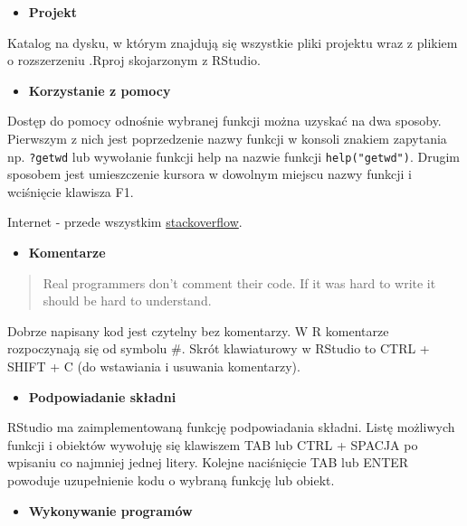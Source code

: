 \documentclass[]{book}
\providecommand{\tightlist}{%
  \setlength{\itemsep}{0pt}\setlength{\parskip}{0pt}}
\begin{document}
\begin{itemize}
\tightlist
\item
  \textbf{Projekt}
\end{itemize}

Katalog na dysku, w którym znajdują się wszystkie pliki projektu wraz z
plikiem o rozszerzeniu .Rproj skojarzonym z RStudio.

\begin{itemize}
\tightlist
\item
  \textbf{Korzystanie z pomocy}
\end{itemize}

Dostęp do pomocy odnośnie wybranej funkcji można uzyskać na dwa sposoby.
Pierwszym z nich jest poprzedzenie nazwy funkcji w konsoli znakiem
zapytania np. \texttt{?getwd} lub wywołanie funkcji help na nazwie
funkcji \texttt{help("getwd")}. Drugim sposobem jest umieszczenie
kursora w dowolnym miejscu nazwy funkcji i wciśnięcie klawisza F1.

Internet - przede wszystkim
\href{https://stackoverflow.com/questions/tagged/r}{stackoverflow}.

\begin{itemize}
\tightlist
\item
  \textbf{Komentarze}
\end{itemize}

\begin{quote}
Real programmers don't comment their code. If it was hard to write it
should be hard to understand.
\end{quote}

Dobrze napisany kod jest czytelny bez komentarzy. W R komentarze
rozpoczynają się od symbolu \#. Skrót klawiaturowy w RStudio to CTRL +
SHIFT + C (do wstawiania i usuwania komentarzy).

\begin{itemize}
\tightlist
\item
  \textbf{Podpowiadanie składni}
\end{itemize}

RStudio ma zaimplementowaną funkcję podpowiadania składni. Listę
możliwych funkcji i obiektów wywołuję się klawiszem TAB lub CTRL +
SPACJA po wpisaniu co najmniej jednej litery. Kolejne naciśnięcie TAB
lub ENTER powoduje uzupełnienie kodu o wybraną funkcję lub obiekt.

\begin{itemize}
\tightlist
\item
  \textbf{Wykonywanie programów}
\end{itemize}
\end{document}
